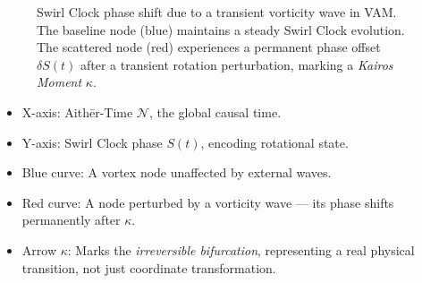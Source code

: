 \documentclass[preprint]{revtex4-2}
\begin{document}
\begin{figure}[H]
\centering


\caption{Swirl Clock phase shift due to a transient vorticity wave in VAM.
The baseline node (blue) maintains a steady Swirl Clock evolution.
The scattered node (red) experiences a permanent phase offset \( \delta S(t) \) after a transient rotation perturbation, marking a \emph{Kairos Moment} \( \kappa \).}
\label{fig:swirl_phase_shift}
\end{figure}

\begin{itemize}
\item X-axis: Aithēr-Time $\mathcal{N}$, the global causal time.
\item Y-axis: Swirl Clock phase $S(t)$, encoding rotational state.
\item Blue curve: A vortex node unaffected by external waves.
\item Red curve: A node perturbed by a vorticity wave — its phase shifts permanently after $\kappa$.
\item Arrow $\kappa$: Marks the \textit{irreversible bifurcation}, representing a real physical transition, not just coordinate transformation.
\end{itemize}
\end{document}
